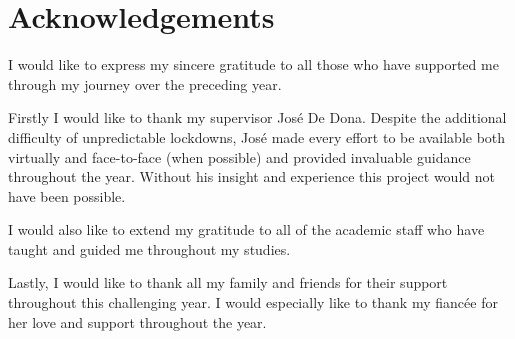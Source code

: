 
\chapter*{Acknowledgements}\label{Acknowledgements}

I would like to express my sincere gratitude to all those who have supported me through my journey over the preceding year.

Firstly I would like to thank my supervisor Jos\'e De Dona. Despite the additional difficulty of unpredictable lockdowns, Jos\'e made every effort to be available both virtually and face-to-face (when possible) and provided invaluable guidance throughout the year. Without his insight and experience this project would not have been possible.

I would also like to extend my gratitude to all of the academic staff who have taught and guided me throughout my studies.

Lastly, I would like to thank all my family and friends for their support throughout this challenging year. I would especially like to thank my fianc\'ee for her love and support throughout the year. 


\clearpage

